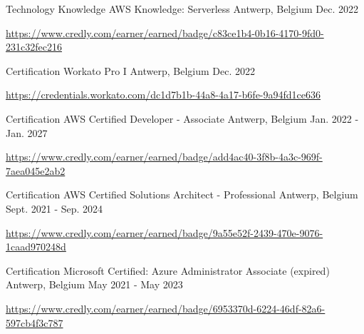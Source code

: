 \begin{cventries}
  \cventry
    {Technology Knowledge} %
    {AWS Knowledge: Serverless} %
    {Antwerp, Belgium} %
    {Dec. 2022} %
    {
      \begin{cvitems} %
        \item \url{https://www.credly.com/earner/earned/badge/c83ce1b4-0b16-4170-9fd0-231c32fec216}
      \end{cvitems}
    }

  \cventry
    {Certification} %
    {Workato Pro I} %
    {Antwerp, Belgium} %
    {Dec. 2022} %
    {
      \begin{cvitems} %
        \item \url{https://credentials.workato.com/dc1d7b1b-44a8-4a17-b6fe-9a94fd1ce636}
      \end{cvitems}
    }

  \cventry
    {Certification} %
    {AWS Certified Developer - Associate} %
    {Antwerp, Belgium} %
    {Jan. 2022 - Jan. 2027} %
    {
      \begin{cvitems} %
        \item \url{https://www.credly.com/earner/earned/badge/add4ac40-3f8b-4a3c-969f-7aea045e2ab2}
      \end{cvitems}
    }


  \cventry
    {Certification} %
    {AWS Certified Solutions Architect - Professional} %
    {Antwerp, Belgium} %
    {Sept. 2021 - Sep. 2024} %
    {
      \begin{cvitems} %
        \item \url{https://www.credly.com/earner/earned/badge/9a55e52f-2439-470e-9076-1caad970248d}
      \end{cvitems}
    }

  \cventry
    {Certification} %
    {Microsoft Certified: Azure Administrator Associate (expired)} %
    {Antwerp, Belgium} %
    {May 2021 - May 2023} %
    {
      \begin{cvitems} %
        \item \url{https://www.credly.com/earner/earned/badge/6953370d-6224-46df-82a6-597cb4f3c787}
      \end{cvitems}
    }


\end{cventries}
